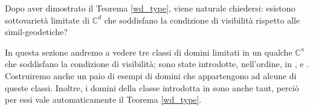 Dopo aver dimostrato il Teorema \ref{wd_type}, viene naturale chiedersi: esistono sottovarietà limitate di $\mathbb{C}^d$ che soddisfano la condizione di visibilità rispetto alle simil-geodetiche?

In questa sezione andremo a vedere tre classi di domini limitati in un qualche $\mathbb{C}^n$ che soddisfano la condizione di visibilità; sono state introdotte, nell'ordine, in \cite{BZ1}, \cite{BM} e \cite{CMS}. Costruiremo anche un paio di esempi di domini che appartengono ad alcune di queste classi. Inoltre, i domini della classe introdotta in \cite{BM} sono anche taut, perciò per essi vale automaticamente il Teorema \ref{wd_type}.